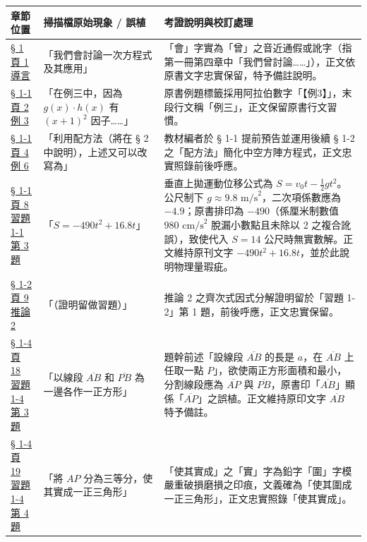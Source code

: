 \documentclass[a4paper,12pt,twoside]{article}
\begin{document}
\begin{table}[H]
\centering
\small
\renewcommand{\arraystretch}{1.35}
\begin{tabularx}{\textwidth}{|p{3.2cm}|p{3.6cm}|X|}
\hline
\textbf{章節位置} & \textbf{掃描檔原始現象 / 誤植} & \textbf{考證說明與校訂處理} \\ \hline

\hyperref[note:b2-ch1-intro-ceng]{§ 1 頁 1 導言} & 
「我們會討論一次方程式及其應用」 & 
「會」字實為「曾」之音近通假或訛字（指第一冊第四章中「我們曾討論……」），正文依原書文字忠實保留，特予備註說明。 \\ \hline

\hyperref[note:b2-ch1-ex3]{§ 1-1 頁 2 例 3} & 
「在例三中，因為 $g(x)\cdot h(x)$ 有 $(x+1)^2$ 因子……」 & 
原書例題標籤採用阿拉伯數字「【例3】」，末段行文稱「例三」，正文保留原書行文習慣。 \\ \hline

\hyperref[note:b2-ch1-ex6]{§ 1-1 頁 4 例 6} & 
「利用配方法（將在 § 2 中說明），上述又可以改寫為」 & 
教材編者於 § 1-1 提前預告並運用後續 § 1-2 之「配方法」簡化中空方陣方程式，正文忠實照錄前後呼應。 \\ \hline

\hyperref[note:b2-ch1-gravity]{§ 1-1 頁 8 習題 1-1 第 3 題} & 
「$S = -490t^2 + 16.8t$」 & 
垂直上拋運動位移公式為 $S = v_0 t - \frac{1}{2}gt^2$。公尺制下 $g \approx 9.8\text{ m/s}^2$，二次項係數應為 $-4.9$；原書排印為 $-490$（係厘米制數值 $980\text{ cm/s}^2$ 脫漏小數點且未除以 2 之複合訛誤），致使代入 $S=14$ 公尺時無實數解。正文維持原刊文字 $-490t^2+16.8t$，並於此說明物理量瑕疵。 \\ \hline

\hyperref[note:b2-ch1-cor2]{§ 1-2 頁 9 推論 2} & 
「（證明留做習題）」 & 
推論 2 之齊次式因式分解證明留於「習題 1-2」第 1 題，前後呼應，正文忠實保留。 \\ \hline

\hyperref[note:b2-ch1-ex1-4-q3]{§ 1-4 頁 18 習題 1-4 第 3 題} & 
「以線段 $\overline{AB}$ 和 $\overline{PB}$ 為一邊各作一正方形」 & 
題幹前述「設線段 $\overline{AB}$ 的長是 $a$，在 $\overline{AB}$ 上任取一點 $P$」，欲使兩正方形面積和最小，分割線段應為 $\overline{AP}$ 與 $\overline{PB}$，原書印「$\overline{AB}$」顯係「$\overline{AP}$」之誤植。正文維持原印文字 $\overline{AB}$ 特予備註。 \\ \hline

\hyperref[note:b2-ch1-ex1-4-q4]{§ 1-4 頁 19 習題 1-4 第 4 題} & 
「將 $AP$ 分為三等分，使其實成一正三角形」 & 
「使其實成」之「實」字為鉛字「圍」字模嚴重破損磨損之印痕，文義確為「使其圍成一正三角形」，正文忠實照錄「使其實成」。 \\ \hline


\end{tabularx}
\end{table}
\end{document}
